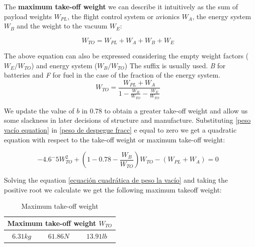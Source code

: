 The \textbf{maximum take-off weight} we can describe it intuitively as the sum of payload weights $W_{PL}$, the flight control system or avionics $W_{A}$, the energy system $W_{B}$ and the weight to the vacuum $W_{E}$:

\begin{equation}
    W_{TO} = W_{PL} + W_{A} + W_{B} + W_{E}
\end{equation}

The above equation can also be expressed considering the empty weight factors ($W_E/W_{TO}$) and energy system ($W_B/W_{TO}$) The suffix is usually used. \textit{B} for batteries and \textit{F} for fuel in the case of the fraction of the energy system. 
\begin{equation}
\label{peso de despegue fracc}
    W_{TO} = \frac{W_{PL}+W_{A}}{1-\frac{W_B}{W_{TO}}-\frac{W_E}{W_{TO}}}
\end{equation}

We update the value of $b$ in $0.78$ to obtain a greater take-off weight and allow us some slackness in later decisions of structure and manufacture. Substituting \ref{peso vacío equation} in \ref{peso de despegue fracc} e equal to zero we get a quadratic equation with respect to the take-off weight or maximum take-off weight:

\begin{equation}
\label{ecuación cuadrática de peso la vacío}
    -4.6^-5 W_{TO}^2 + (1-0.78-\frac{W_B}{W_{TO}})W_{TO} - (W_{PL}+W_{A})=0
\end{equation}

 
Solving the equation \ref{ecuación cuadrática de peso la vacío} and taking the positive root we calculate we get the following maximum takeoff weight:

\begin{table}[h]
    \centering
    \begin{tabular}{|c|c|c|}
    \hline
     \multicolumn{3}{|c|}{Maximum take-off weight $W_{TO}$} \\
     \hline
    $6.31 kg$ & $61.86 N$ & $13.91 lb$ \\
     \hline
    \end{tabular}
    \caption{Maximum take-off weight}
    \label{peso maximo de despegue}
\end{table}

